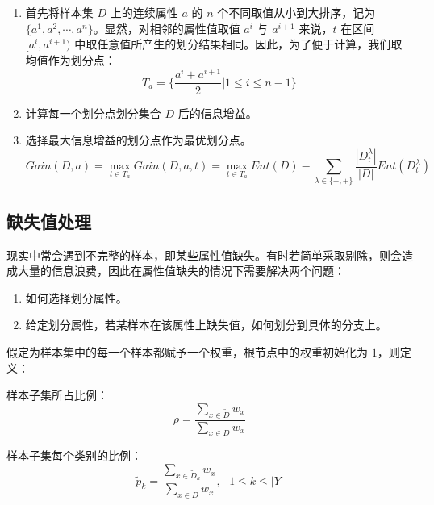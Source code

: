 \documentclass[12pt, a4paper]{article} %
\begin{document}
\begin{enumerate}[\hspace*{2em} i.]
    \item 首先将样本集 $D$ 上的连续属性 $a$ 的 $n$ 个不同取值从小到大排序，记为 $\{a^1, a^2, \cdots, a^n\}$。显然，对相邻的属性值取值 $a^i$ 与 $a^{i + 1}$ 来说，$t$ 在区间 $[a^i, a^{i + 1})$ 中取任意值所产生的划分结果相同。因此，为了便于计算，我们取均值作为划分点：
    \begin{equation*}
        T_a = \{
            \frac{a^i + a^{i + 1}}{2} | 1 \le i \le n - 1
        \}
    \end{equation*}
    \item 计算每一个划分点划分集合 $D$ 后的信息增益。
    \item 选择最大信息增益的划分点作为最优划分点。
    \begin{equation*}
        Gain(D, a) = \max_{t \in T_a} Gain(D, a, t) = \max_{t \in T_a} Ent(D) - \sum_{\lambda \in \{-, +\}} \frac{|D_t^\lambda|}{|D|} Ent(D_t^\lambda)
    \end{equation*}
\end{enumerate}

\subsection{缺失值处理}

现实中常会遇到不完整的样本，即某些属性值缺失。有时若简单采取剔除，则会造成大量的信息浪费，因此在属性值缺失的情况下需要解决两个问题：

\begin{enumerate}[\hspace*{2em} i.]
    \item 如何选择划分属性。
    \item 给定划分属性，若某样本在该属性上缺失值，如何划分到具体的分支上。
\end{enumerate}

假定为样本集中的每一个样本都赋予一个权重，根节点中的权重初始化为 $1$，则定义：

样本子集所占比例：
\begin{equation*}
    \rho = \frac{\sum_{x \in \tilde{D}} w_x}{\sum_{x \in D} w_x}
\end{equation*}

样本子集每个类别的比例：
\begin{equation*}
    \tilde{p}_k = \frac{\sum_{x \in \tilde{D}_k} w_x}{\sum_{x \in \tilde{D}} w_x}, \ \ \ 1 \le k \le |Y|
\end{equation*}
\end{document}
